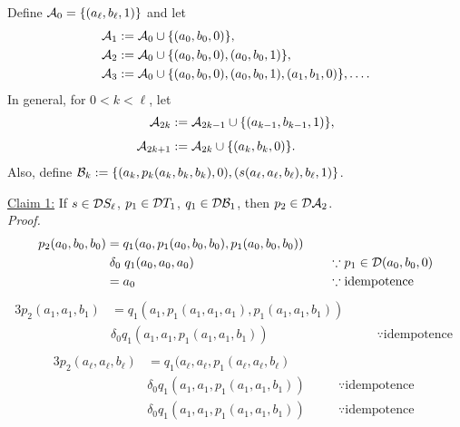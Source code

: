   Define $\mathcal{A}_0 =\{(a_\ell, b_\ell, 1)\}$ and let
  \begin{align*}
    \mathcal{A}_1 &:=\mathcal{A}_0  \cup \{(a_0, b_0, 0) \},\\
    \mathcal{A}_2 &:=\mathcal{A}_0  \cup \{(a_0, b_0, 0), (a_0, b_0, 1)\},\\
    \mathcal{A}_3 &:= \mathcal{A}_0  \cup \{(a_0, b_0, 0), (a_0, b_0, 1), (a_1,b_1,0)\}, \dots.
  \end{align*}
    In general, for $0< k < \ell$, let
  \begin{align*}
    \mathcal{A}_{2k} &:= \mathcal{A}_{2k-1} \cup \{(a_{k-1},b_{k-1},1)\},\\[4pt]
    \mathcal{A}_{2k+1} &:= \mathcal{A}_{2k} \cup \{(a_{k},b_{k},0)\}.
  \end{align*}
  Also, define $\mathcal{B}_k := \{(a_k, p_k(a_k, b_k, b_k), 0), (s(a_{\ell}, a_{\ell}, b_{\ell}), b_{\ell}, 1)\}$.

  \medskip

  \noindent \underline{Claim 1:}
  If
  $s \in \mathcal{D} S_\ell$,
  $p_1 \in \mathcal{D} T_1$,
  $q_1\in \mathcal{D} \mathcal{B}_1$, then $p_2 \in \mathcal{D} \mathcal{A}_2$.\\[5pt]
  \emph{Proof.}
  \begin{alignat*}{3}
  p_2(a_0, b_0, b_0) &= q_1(a_0, p_1(a_0,b_0,b_0), p_1(a_0,b_0,b_0)) &  &\\
  &\mathrel{\delta_0} q_1(a_0, a_0, a_0) & \quad&\because p_1\in \mathcal{D} (a_0, b_0, 0)  \\
  &= a_0 & \quad&\because \text{idempotence }
  \end{alignat*}
  \begin{alignat*}{3}
  p_2(a_1, a_1, b_1) &= q_1(a_1, p_1(a_1,a_1,a_1), p_1(a_1,a_1,b_1)) &  &\\
  &\mathrel{\delta_0} q_1(a_1, a_1, p_1(a_1, a_1, b_1)) & \quad&\because \text{idempotence }  \\
  \end{alignat*}
  \begin{alignat*}{3}
  p_2(a_\ell, a_\ell, b_\ell) &= q_1(a_\ell, a_\ell, p_1(a_\ell,a_\ell,b_\ell) &  &\\
  &\mathrel{\delta_0} q_1(a_1, a_1, p_1(a_1, a_1, b_1)) & \quad&\because \text{idempotence }  \\
  &\mathrel{\delta_0} q_1(a_1, a_1, p_1(a_1, a_1, b_1)) & \quad&\because \text{idempotence }  \\
  \end{alignat*}



